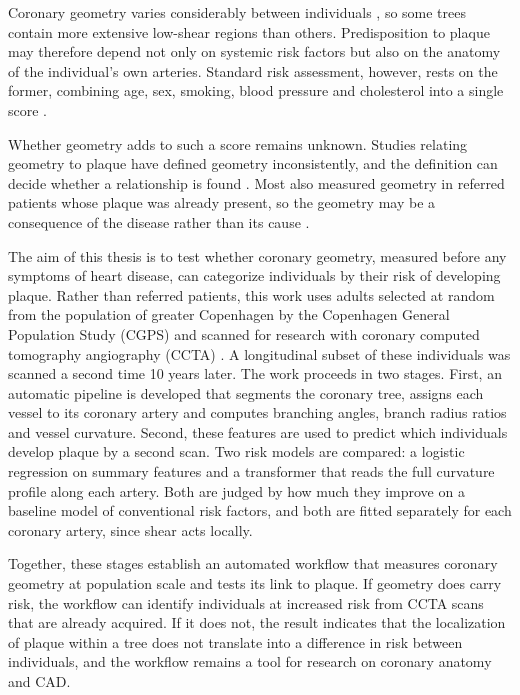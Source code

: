 Coronary geometry varies considerably between individuals \cite{temov2016bifurcation}, so some
trees contain more extensive low-shear regions than others.
Predisposition to plaque may therefore depend not only on systemic risk factors but also on the
anatomy of the individual's own arteries.
Standard risk assessment, however, rests on the former, combining age, sex, smoking, blood
pressure and cholesterol into a single score \cite{score2_2021}.

Whether geometry adds to such a score remains unknown.
Studies relating geometry to plaque have defined geometry inconsistently, and the definition can
decide whether a relationship is found \cite{cui2017bifurcation,kashyap2022tortuosity}.
Most also measured geometry in referred patients whose plaque was already present, so the geometry
may be a consequence of the disease rather than its cause \cite{han2022plaque}.

The aim of this thesis is to test whether coronary geometry, measured before any symptoms of heart
disease, can categorize individuals by their risk of developing plaque.
Rather than referred patients, this work uses adults selected at random from the population of
greater Copenhagen by the Copenhagen General Population Study (CGPS) and scanned for research with
coronary computed tomography angiography (CCTA) \cite{fuchs2023cgps}.
A longitudinal subset of these individuals was scanned a second time 10 years later.
The work proceeds in two stages.
First, an automatic pipeline is developed that segments the coronary tree, assigns each vessel to
its coronary artery and computes branching angles, branch radius ratios and vessel curvature.
Second, these features are used to predict which individuals develop plaque by a second scan.
Two risk models are compared: a logistic regression on summary features and a transformer that reads
the full curvature profile along each artery.
Both are judged by how much they improve on a baseline model of conventional risk factors, and both are fitted
separately for each coronary artery, since shear acts locally.

Together, these stages establish an automated workflow that measures coronary geometry at population
scale and tests its link to plaque.
If geometry does carry risk, the workflow can identify individuals at increased risk from CCTA scans
that are already acquired.
If it does not, the result indicates that the localization of plaque within a tree does not translate
into a difference in risk between individuals, and the workflow remains a tool for research on
coronary anatomy and CAD.
